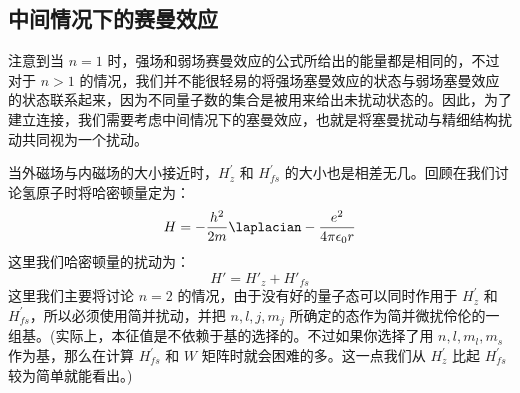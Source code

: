 \subsection{中间情况下的赛曼效应}
注意到当 $n=1$ 时，强场和弱场赛曼效应的公式所给出的能量都是相同的，不过对于 $n > 1$ 的情况，我们并不能很轻易的将强场塞曼效应的状态与弱场塞曼效应的状态联系起来，因为不同量子数的集合是被用来给出未扰动状态的。因此，为了建立连接，我们需要考虑中间情况下的塞曼效应，也就是将塞曼扰动与精细结构扰动共同视为一个扰动。

当外磁场与内磁场的大小接近时，$H_z^{'}$ 和 $H_{fs}^{'}$ 的大小也是相差无几。回顾在我们讨论氢原子时将哈密顿量定为：\begin{equation}
H=-\frac{h^2}{2m}\laplacian-\frac{e^2}{4\pi\epsilon_0 r}
\end{equation}
这里我们哈密顿量的扰动为：
\begin{equation}
H'=H'_z+H'_{fs}
\end{equation}
这里我们主要将讨论 $n=2$ 的情况，由于没有好的量子态可以同时作用于 $H_z^{'}$ 和 $H_{fs}^{'}$，所以必须使用简并扰动，并把 $n,l,j,m_j$ 所确定的态作为简并微扰伶伦的一组基。(实际上，本征值是不依赖于基的选择的。不过如果你选择了用 $n,l,m_l,m_s$ 作为基，那么在计算 $H_{fs}^{'}$ 和 $W$ 矩阵时就会困难的多。这一点我们从 $H_z^{'}$ 比起 $H_{fs}^{'}$ 较为简单就能看出。)

